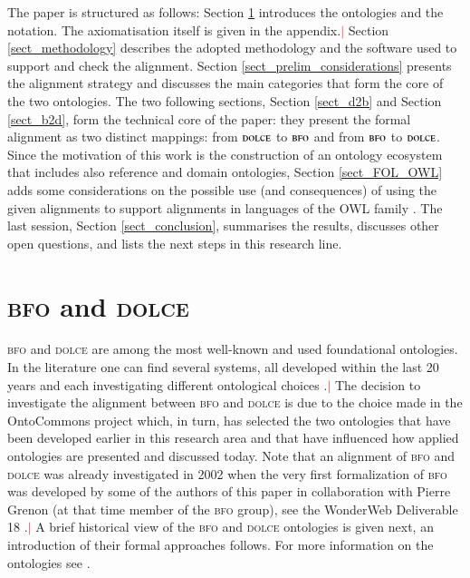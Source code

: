 \documentclass[ao]{iosart2x}
\newcommand{\nb}[1]{\textcolor{red}{$|$}\marginpar{\hspace*{-0cm}\parbox{20mm}{\scriptsize\raggedright\textcolor{red}{#1}}}}
\newcommand{\dolce}{{\textsc{dolce}}}
\newcommand{\bfo}{{\textsc{bfo}}}
\begin{document}
The paper is structured as follows: 
Section \ref{sect_bfo_and_dolce} introduces the ontologies and the notation. The axiomatisation itself is given in the appendix.\nb{CM: non sono sicuro sia una buon idea perché quella di DOLCE ce l'abbiamo mentre per quella di BFO non abbiamo tutti gli assiomi. Inoltre poi in sez. 2.1 diciamo diversamente} 
Section \ref{sect_methodology} describes the adopted methodology and the software used to support and check the alignment. 
Section \ref{sect_prelim_considerations} presents the alignment strategy and discusses the main categories that form the core of the two ontologies. 
The two following sections, Section \ref{sect_d2b} and Section \ref{sect_b2d}, form the technical core of the paper: they present the formal alignment as two distinct mappings: from $\dolce$ to $\bfo$ and from $\bfo$ to $\dolce$. 
Since the motivation of this work is the construction of an ontology ecosystem that includes also reference and domain ontologies, Section \ref{sect_FOL_OWL} adds some considerations on the possible use (and consequences) of using the given alignments to support alignments in languages of the OWL family \citep{OWL}. 
The last session, Section \ref{sect_conclusion}, summarises the results, discusses other open questions, and lists the next steps in this research line.


\section{{\bfo} and {\dolce}}
\label{sect_bfo_and_dolce}


{\bfo} and {\dolce} are among the most well-known and used foundational ontologies. In the literature one can find several systems, all developed within the last 20 years and each investigating different ontological choices \citep{guarino}.\nb{CM: non ho capito che cosa si voleva citare qui, forse lo special issue di AO?} The decision to investigate the alignment between {\bfo} and {\dolce} is due to the choice made in the OntoCommons project which, in turn, has selected the two ontologies that have been developed earlier in this research area and that have influenced how applied ontologies are presented and discussed today. Note that an alignment of {\bfo} and {\dolce} was already investigated in 2002 when the very first formalization of {\bfo} was developed by some of the authors of this paper in collaboration with Pierre Grenon (at that time member of the {\bfo} group), see the WonderWeb Deliverable 18 \citep{D18}.\nb{CM: (1) questo non è vero; (2) citare qui i lavori che esistono su questo inclusi quelli di Nicola?}
A brief historical view of the {\bfo} and {\dolce} ontologies is given next, an introduction of their formal approaches follows. For more information on the ontologies see \citep{ISO21838, borgoDOLCEDescriptiveOntology2022}.
\end{document}
